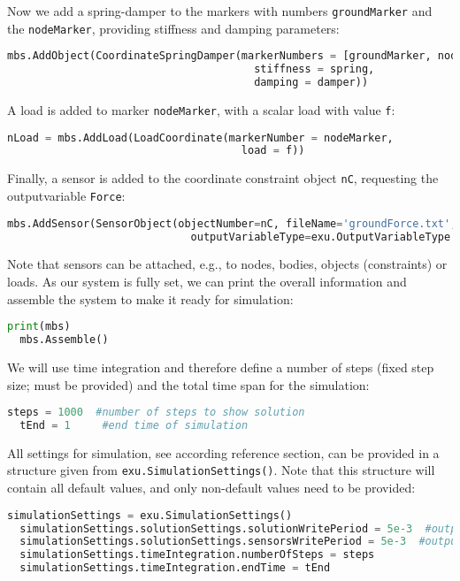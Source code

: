 Now we add a spring-damper to the markers with numbers \texttt{groundMarker} and the \texttt{nodeMarker}, providing stiffness and damping parameters:
\begin{lstlisting}[language=Python, firstnumber=29]
  mbs.AddObject(CoordinateSpringDamper(markerNumbers = [groundMarker, nodeMarker], 
                                       stiffness = spring, 
                                       damping = damper)) 
\end{lstlisting}
%
A load is added to marker \texttt{nodeMarker}, with a scalar load with value \texttt{f}:
\begin{lstlisting}[language=Python, firstnumber=32]
  nLoad = mbs.AddLoad(LoadCoordinate(markerNumber = nodeMarker, 
                                     load = f))
\end{lstlisting}
%
Finally, a sensor is added to the coordinate constraint object \texttt{nC}, requesting the outputvariable \texttt{Force}:
\begin{lstlisting}[language=Python, firstnumber=34]
  mbs.AddSensor(SensorObject(objectNumber=nC, fileName='groundForce.txt', 
                             outputVariableType=exu.OutputVariableType.Force))
\end{lstlisting}
Note that sensors can be attached, e.g., to nodes, bodies, objects (constraints) or loads.
%
As our system is fully set, we can print the overall information and assemble the system to make it ready for simulation:
\begin{lstlisting}[language=Python, firstnumber=36]
  print(mbs)
  mbs.Assemble()
\end{lstlisting}
%
We will use time integration and therefore define a number of steps (fixed step size; must be provided) and the total time span for the simulation:
\begin{lstlisting}[language=Python, firstnumber=38]
  steps = 1000  #number of steps to show solution
  tEnd = 1     #end time of simulation
\end{lstlisting}
%
All settings for simulation, see according reference section, can be provided in a structure given from \texttt{exu.SimulationSettings()}. Note that this structure will contain all default values, and only non-default values need to be provided:
\begin{lstlisting}[language=Python, firstnumber=40]
  simulationSettings = exu.SimulationSettings()
  simulationSettings.solutionSettings.solutionWritePeriod = 5e-3  #output interval general
  simulationSettings.solutionSettings.sensorsWritePeriod = 5e-3  #output interval of sensors
  simulationSettings.timeIntegration.numberOfSteps = steps
  simulationSettings.timeIntegration.endTime = tEnd
\end{lstlisting}
